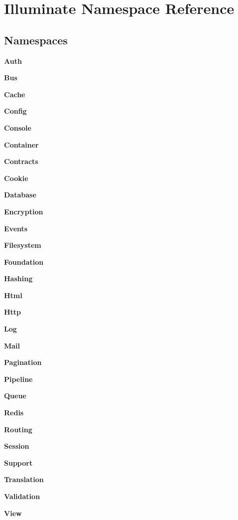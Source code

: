 \section{Illuminate Namespace Reference}
\label{namespace_illuminate}
\subsection*{Namespaces}
\begin{DoxyCompactItemize}
\item 
 {\bf Auth}
\item 
 {\bf Bus}
\item 
 {\bf Cache}
\item 
 {\bf Config}
\item 
 {\bf Console}
\item 
 {\bf Container}
\item 
 {\bf Contracts}
\item 
 {\bf Cookie}
\item 
 {\bf Database}
\item 
 {\bf Encryption}
\item 
 {\bf Events}
\item 
 {\bf Filesystem}
\item 
 {\bf Foundation}
\item 
 {\bf Hashing}
\item 
 {\bf Html}
\item 
 {\bf Http}
\item 
 {\bf Log}
\item 
 {\bf Mail}
\item 
 {\bf Pagination}
\item 
 {\bf Pipeline}
\item 
 {\bf Queue}
\item 
 {\bf Redis}
\item 
 {\bf Routing}
\item 
 {\bf Session}
\item 
 {\bf Support}
\item 
 {\bf Translation}
\item 
 {\bf Validation}
\item 
 {\bf View}
\end{DoxyCompactItemize}
